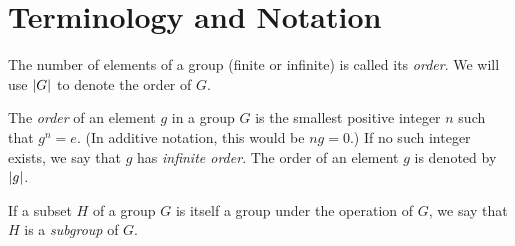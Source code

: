\section{Terminology and Notation}

\begin{definition}
	The number of elements of a group (finite or infinite) is called its \textit{order}. We will use $\left\lvert G \right\rvert$ to denote the order of $G$.
\end{definition}

\begin{definition}
	The \textit{order} of an element $g$ in a group $G$ is the smallest positive integer $n$ such that $g^n = e$. (In additive notation, this would be $ng = 0$.) If no such integer exists, we say that $g$ has \textit{infinite order}. The order of an element $g$ is denoted by $\left\lvert g \right\rvert$.
\end{definition}

\begin{definition}[Subgroup]
	If a subset $H$ of a group $G$ is itself a group under the operation of $G$, we say that $H$ is a \textit{subgroup} of $G$.
\end{definition}

